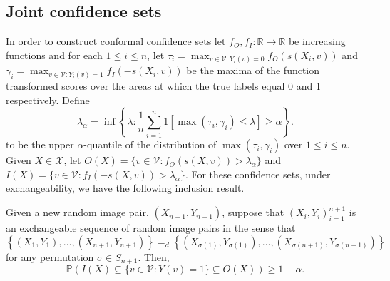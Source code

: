 \subsection{Joint confidence sets}
In order to construct conformal confidence sets let $f_O, f_I:\mathbb{R} \rightarrow \mathbb{R}$ be increasing functions and for each $1\leq i \leq n$, let $\tau_i = \max_{v \in \mathcal{V}: Y_i(v) = 0} f_O(s(X_i,v))$ and $\gamma_i = \max_{v \in \mathcal{V}: Y_i(v) = 1} f_I(-s(X_i,v))$  be the maxima of the function transformed scores over the areas at which the true labels equal 0 and 1 respectively. Define
\begin{equation*}
	\lambda_{\alpha} = \inf\left\lbrace \lambda: \frac{1}{n} \sum_{i = 1}^n 1\left[ \max(\tau_i, \gamma_i) \leq \lambda \right] \geq \alpha \right\rbrace.
\end{equation*}
to be the upper $\alpha$-quantile of the distribution of $\max(\tau_i, \gamma_i)$ over $1 \leq i \leq n$. Given $X \in \mathcal{X}$, let $O(X) = \lbrace v \in \mathcal{V}: f_O(s(X,v)) > \lambda_{\alpha} \rbrace $ and $I(X) = \lbrace v \in \mathcal{V}: f_I(-s(X,v)) > \lambda_{\alpha} \rbrace $. For these confidence sets, under exchangeability, we have the following inclusion result.
\begin{theorem}
	Given a new random image pair, $(X_{n+1},Y_{n+1})$, suppose that $(X_i, Y_i)_{i = 1}^{n+1}$ is an exchangeable sequence of random image pairs in the sense that 
	\begin{equation*}
		\left\lbrace (X_1,Y_1), \dots, (X_{n+1}, Y_{n+1}) \right\rbrace =_d \left\lbrace (X_{\sigma(1)}, Y_{\sigma(1)}), \dots, (X_{\sigma(n+1)}, Y_{\sigma(n+1)}) \right\rbrace
	\end{equation*}
	for any permutation $\sigma \in S_{n+1}$. Then,
\begin{equation}\label{eq:probstat}
	\mathbb{P}\left( I(X) \subseteq \lbrace v\in \mathcal{V}: Y(v) = 1 \rbrace \subseteq O(X) \right) \geq 1 - \alpha.
\end{equation}
\end{theorem}
